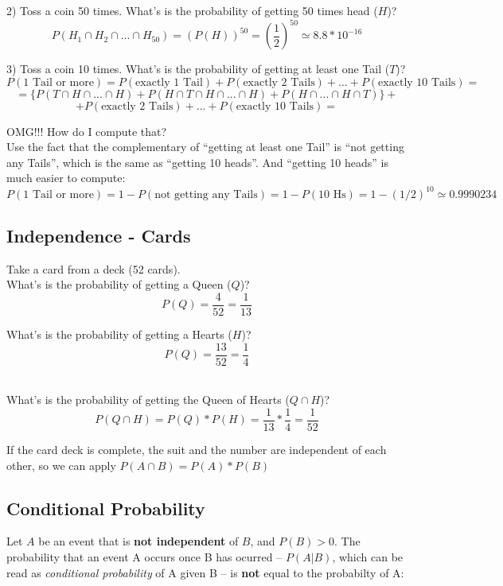 \documentclass[11pt]{article}
\begin{document}
	2) Toss a coin 50 times. What's is the probability of getting 50 times head ($H$)?
	\[P(H_1\cap H_2 \cap...\cap H_{50}) = (P(H))^{50} = \left(\frac{1}{2}\right)^{50} \simeq 8.8 * 10^{-16}\]
	
	3) Toss a coin 10 times. What's is the probability of  getting at least one Tail ($T$)?
	\[P(\text{1 Tail or more}) = P(\text{exactly 1 Tail}) + P(\text{exactly 2 Tails}) + ... + P(\text{exactly 10 Tails}) =\]
	\[= \{P(T\cap H \cap ... \cap H) + P(H \cap T\cap H \cap ... \cap H) + P(H \cap ... \cap H \cap T)\} +  \]
	\[+P(\text{exactly 2 Tails}) + ... + P(\text{exactly 10 Tails}) =\]

	OMG!!! How do I compute that?\\

	Use the fact that the complementary of ``getting at least one Tail'' is ``not getting any Tails'', which is the same as ``getting 10 heads''. And ``getting 10 heads'' is much easier to compute:
	\[P(\text{1 Tail or more}) = 1 - P(\text{not getting any Tails}) = 1 - P(\text{10 Hs}) = 1 - (1/2)^{10}  \simeq 0.9990234\]


	\subsection*{Independence - Cards}
	
	Take a card from a deck (52 cards).\\
	
	What's is the probability of getting a Queen ($Q$)?
	\[P(Q) = \frac{4}{52} = \frac{1}{13}\]
	
	What's is the probability of getting a Hearts ($H$)?
	\[P(Q) = \frac{13}{52} = \frac{1}{4}\]\
	
	
	What's is the probability of getting the Queen of Hearts ($Q \cap H$)?
	\[P(Q \cap H) = P(Q) * P(H) = \frac{1}{13} * \frac{1}{4} = \frac{1}{52}\]

	If the card deck is complete, the suit and the number are independent of each other, so we can apply $P(A \cap B) = P(A) * P(B)$

	\subsection*{Conditional Probability}
	
	Let $A$ be an event that is \textbf{not independent} of $B$, and $P(B)>0$. The probability that an event A occurs once B has ocurred -- $P(A|B)$, which can be read as \emph{conditional probability} of A given B -- is \textbf{not} equal to the probabilty of A:
	
\end{document}
